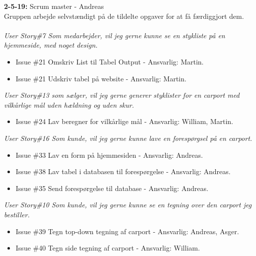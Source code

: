 \documentclass[11pt]{report}
\begin{document}
\noindent\textbf{2-5-19:} Scrum master - Andreas\\
Gruppen arbejde selvstændigt på de tildelte opgaver for at få færdiggjort dem.\\\\
\textit{User Story\#7 Som medarbejder, vil jeg gerne kunne se en stykliste på en hjemmeside, med noget design.}
\begin{itemize}
\renewcommand\labelitemi{--}
\item Issue \#21 Omskriv List til Tabel Output - Ansvarlig: Martin.
\item Issue \#21 Udskriv tabel på website - Ansvarlig: Martin.
\end{itemize}
\textit{User Story\#13 som sælger, vil jeg gerne generer styklister for en carport med vilkårlige mål uden hældning og uden skur.}
\begin{itemize}
\renewcommand\labelitemi{--}
\item Issue \#24 Lav beregner for vilkårlige mål - Ansvarlig: William, Martin.
\end{itemize}
\textit{User Story\#16 Som kunde, vil jeg gerne kunne lave en forespørgsel på en carport.}
\begin{itemize}
\renewcommand\labelitemi{--}
\item Issue \#33 Lav en form på hjemmesiden - Ansvarlig: Andreas.
\item Issue \#38 Lav tabel i databasen til forespørgelse - Ansvarlig: Andreas.
\item Issue \#35 Send forespørgelse til database - Ansvarlig: Andreas.
\end{itemize}
\textit{User Story\#10 Som kunde, vil jeg gerne kunne se en tegning over den carport jeg bestiller.}
\begin{itemize}
\renewcommand\labelitemi{--}
\item Issue \#39 Tegn top-down tegning af carport - Ansvarlig: Andreas, Asger.
\item Issue \#40 Tegn side tegning af carport - Ansvarlig: William.
\end{itemize}
\end{document}
